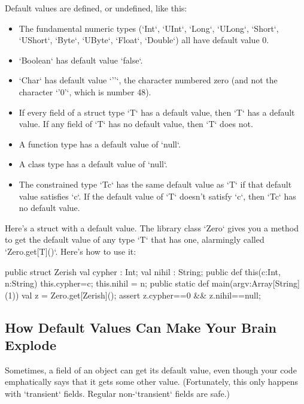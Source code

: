 Default values are defined, or undefined, like this:
\begin{itemize}
\item The fundamental numeric types (\xcd`Int`, \xcd`UInt`,
      \xcd`Long`, \xcd`ULong`, 
  \xcd`Short`, \xcd`UShort`, \xcd`Byte`,
   \xcd`UByte`, 
      \xcd`Float`, \xcd`Double`) all have default value 0.
\item \xcd`Boolean` has default value \xcd`false`.
\item \xcd`Char` has default value \xcd`'\0'`, the character numbered zero
      (and not the character \xcd`'0'`, which is number 48). 
\item If every field of a struct type \xcd`T` has a default value, then
      \xcd`T` has a default value.  If any field of \xcd`T` has no default
      value, then \xcd`T` does not. 
\item A function type has a default value of \xcd`null`.
\item A class type has a default value of \xcd`null`.
\item The constrained type \xcd`T{c}` has the same default value as \xcd`T` if
      that default value satisfies \xcd`c`.  If the default value of \xcd`T`
      doesn't satisfy \xcd`c`, then \xcd`T{c}` has no default value.
\end{itemize}

Here's a struct with a default value.  The library class \xcd`Zero` gives you
a method to get the default value of any type \xcd`T` that has one, alarmingly
called \xcd`Zero.get[T]()`.  Here's how to use it: 
\begin{xtennum}[]
public struct Zerish {
  val cypher : Int;
  val nihil : String;
  public def this(c:Int, n:String) {
    this.cypher=c; this.nihil = n;
  }
  public static def main(argv:Array[String](1)) {
     val z = Zero.get[Zerish]();
     assert z.cypher==0 && z.nihil==null;
  }
}
\end{xtennum}

\subsection{How Default Values Can Make Your Brain Explode}

Sometimes, a field of an object can get its default value, even though your
code emphatically says that it gets some other value.  (Fortunately, this only
happens with \xcd`transient` fields.  Regular non-\xcd`transient` fields are
safe.)

